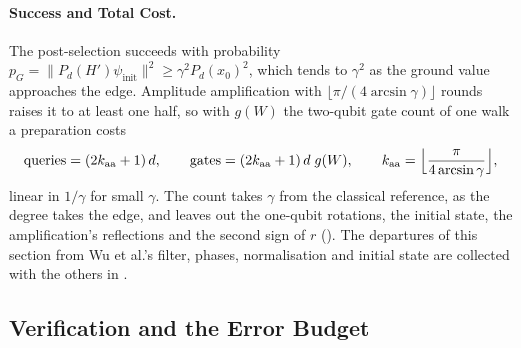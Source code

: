 \paragraph{Success and Total Cost.} The post-selection succeeds with probability $p_G=\|P_d(H')\psi_{\mathrm{init}}\|^2\ge\gamma^2P_d(x_0)^2$, which tends to $\gamma^2$ as the ground value approaches the edge. Amplitude amplification \cite{brassard2000amplitude} with $\lfloor\pi/(4\arcsin\gamma)\rfloor$ rounds raises it to at least one half, so with $g(W)$ the two-qubit gate count of one walk a preparation costs
\begin{equation}
    \text{queries}=(2k_{\mathrm{aa}}+1)\,d,
    \qquad
    \text{gates}=(2k_{\mathrm{aa}}+1)\,d\;g(W),
    \qquad
    k_{\mathrm{aa}}=\Bigl\lfloor\frac{\pi}{4\arcsin\gamma}\Bigr\rfloor,
    \label{eq:total-cost}
\end{equation}
linear in $1/\gamma$ for small $\gamma$. The count takes $\gamma$ from the classical reference, as the degree takes the edge, and leaves out the one-qubit rotations, the initial state, the amplification's reflections and the second sign of $r$ (). The departures of this section from Wu et al.'s filter, phases, normalisation and initial state are collected with the others in .

\subsection{Verification and the Error Budget}
\label{sec:pipeline-verification}

